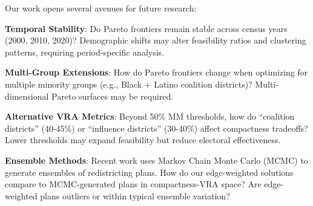 Our work opens several avenues for future research:

\textbf{Temporal Stability}: Do Pareto frontiers remain stable across census years (2000, 2010, 2020)? Demographic shifts may alter feasibility ratios and clustering patterns, requiring period-specific analysis.

\textbf{Multi-Group Extensions}: How do Pareto frontiers change when optimizing for multiple minority groups (e.g., Black + Latino coalition districts)? Multi-dimensional Pareto surfaces may be required.

\textbf{Alternative VRA Metrics}: Beyond 50\% MM thresholds, how do ``coalition districts'' (40-45\%) or ``influence districts'' (30-40\%) affect compactness tradeoffs? Lower thresholds may expand feasibility but reduce electoral effectiveness.

\textbf{Ensemble Methods}: Recent work uses Markov Chain Monte Carlo (MCMC) to generate ensembles of redistricting plans. How do our edge-weighted solutions compare to MCMC-generated plans in compactness-VRA space? Are edge-weighted plans outliers or within typical ensemble variation?
